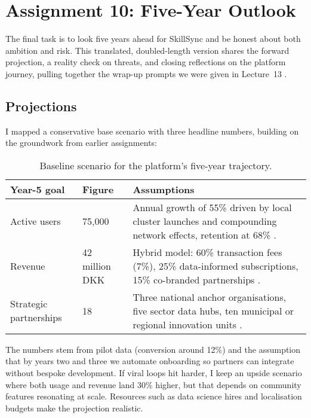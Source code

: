 \section*{Assignment 10: Five-Year Outlook}

The final task is to look five years ahead for SkillSync and be honest about both ambition and risk. This translated, doubled-length version shares the forward projection, a reality check on threats, and closing reflections on the platform journey, pulling together the wrap-up prompts we were given in Lecture~13 \citep{Lecture13}.

\subsection*{Projections}
I mapped a conservative base scenario with three headline numbers, building on the groundwork from earlier assignments:\newline
\begin{table}[h]
  \centering
  \begin{tabular}{p{3cm}p{3.5cm}p{6cm}}
    \toprule
    \textbf{Year-5 goal} & \textbf{Figure} & \textbf{Assumptions} \\
    \midrule
    Active users & 75,000 & Annual growth of 55\% driven by local cluster launches and compounding network effects, retention at 68\% \citep{Choudary2016,Srnicek2017}. \\
    Revenue & 42 million DKK & Hybrid model: 60\% transaction fees (7\%), 25\% data-informed subscriptions, 15\% co-branded partnerships \citep{ShapiroVarian1999}. \\
    Strategic partnerships & 18 & Three national anchor organisations, five sector data hubs, ten municipal or regional innovation units \citep{Reillier2017}. \\
    \bottomrule
  \end{tabular}
  \caption{Baseline scenario for the platform’s five-year trajectory.}
\end{table}

The numbers stem from pilot data (conversion around 12\%) and the assumption that by years two and three we automate onboarding so partners can integrate without bespoke development. If viral loops hit harder, I keep an upside scenario where both usage and revenue land 30\% higher, but that depends on community features resonating at scale. Resources such as data science hires and localisation budgets make the projection realistic.

